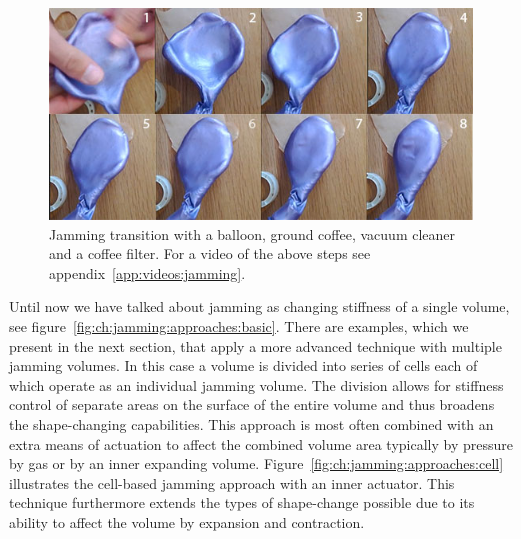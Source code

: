 \begin{figure}[h]
  \centering
  \includegraphics[width=.9\textwidth]{figures/jamming/jamming-transition}
  \caption[A jamming transition setup.]
  {Jamming transition with a balloon, ground coffee, vacuum cleaner and a coffee filter. For a video of the above steps see appendix~\ref{app:videos:jamming}.}
  \label{fig:ch:jamming:jamming-transition}
\end{figure}

Until now we have talked about jamming as changing stiffness of a single volume, see figure~\ref{fig:ch:jamming:approaches:basic}.
There are examples, which we present in the next section, that apply a more advanced technique with multiple jamming volumes.
In this case a volume is divided into series of cells each of which operate as an individual jamming volume.
The division allows for stiffness control of separate areas on the surface of the entire volume and thus broadens the shape-changing capabilities.
This approach is most often combined with an extra means of actuation to affect the combined volume area typically by pressure by gas or by an inner expanding volume. 
Figure~\ref{fig:ch:jamming:approaches:cell} illustrates the cell-based jamming approach with an inner actuator.
This technique furthermore extends the types of shape-change possible due to its ability to affect the volume by expansion and contraction. 

